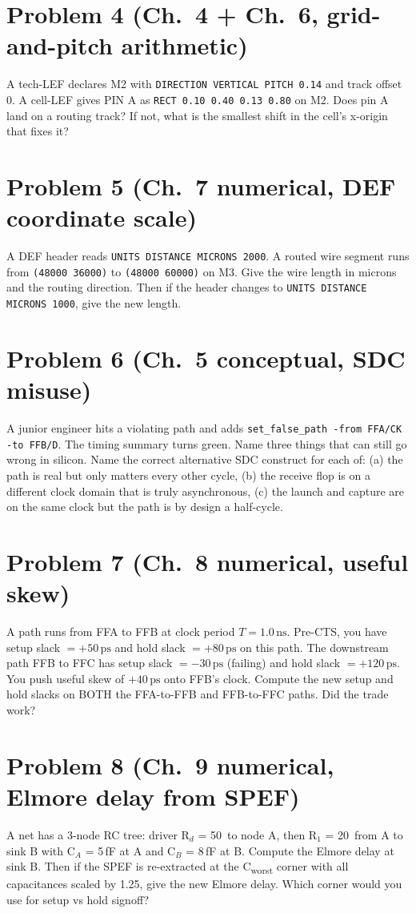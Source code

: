 \section*{Problem 4 (Ch.~4 + Ch.~6, grid-and-pitch arithmetic)}
A tech-LEF declares M2 with \texttt{DIRECTION VERTICAL PITCH 0.14} and track offset 0. A cell-LEF gives PIN A as \texttt{RECT 0.10 0.40 0.13 0.80} on M2. Does pin A land on a routing track? If not, what is the smallest shift in the cell's x-origin that fixes it?

\section*{Problem 5 (Ch.~7 numerical, DEF coordinate scale)}
A DEF header reads \texttt{UNITS DISTANCE MICRONS 2000}. A routed wire segment runs from \texttt{(48000 36000)} to \texttt{(48000 60000)} on M3. Give the wire length in microns and the routing direction. Then if the header changes to \texttt{UNITS DISTANCE MICRONS 1000}, give the new length.

\section*{Problem 6 (Ch.~5 conceptual, SDC misuse)}
A junior engineer hits a violating path and adds \texttt{set\_false\_path -from FFA/CK -to FFB/D}. The timing summary turns green. Name three things that can still go wrong in silicon. Name the correct alternative SDC construct for each of: (a) the path is real but only matters every other cycle, (b) the receive flop is on a different clock domain that is truly asynchronous, (c) the launch and capture are on the same clock but the path is by design a half-cycle.

\section*{Problem 7 (Ch.~8 numerical, useful skew)}
A path runs from FFA to FFB at clock period $T = 1.0\,\text{ns}$. Pre-CTS, you have setup slack $= +50\,\text{ps}$ and hold slack $= +80\,\text{ps}$ on this path. The downstream path FFB to FFC has setup slack $= -30\,\text{ps}$ (failing) and hold slack $= +120\,\text{ps}$. You push useful skew of $+40\,\text{ps}$ onto FFB's clock. Compute the new setup and hold slacks on BOTH the FFA-to-FFB and FFB-to-FFC paths. Did the trade work?

\section*{Problem 8 (Ch.~9 numerical, Elmore delay from SPEF)}
A net has a 3-node RC tree: driver R$_d$ = 50\,\textohm{} to node A, then R$_1$ = 20\,\textohm{} from A to sink B with C$_A$ = 5\,fF at A and C$_B$ = 8\,fF at B. Compute the Elmore delay at sink B. Then if the SPEF is re-extracted at the C\textsubscript{worst} corner with all capacitances scaled by 1.25, give the new Elmore delay. Which corner would you use for setup vs hold signoff?

